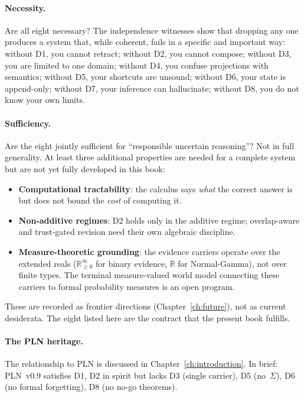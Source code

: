\documentclass[11pt,openany]{report}
\begin{document}
\paragraph{Necessity.}
Are all eight necessary?  The independence witnesses show that dropping
any one produces a system that, while coherent, fails in a specific and
important way: without D1, you cannot retract; without D2, you cannot
compose; without D3, you are limited to one domain; without D4, you
confuse projections with semantics; without D5, your shortcuts are
unsound; without D6, your state is append-only; without D7, your
inference can hallucinate; without D8, you do not know your own limits.

\paragraph{Sufficiency.}
Are the eight jointly sufficient for ``responsible uncertain
reasoning''?  Not in full generality.  At least three additional
properties are needed for a complete system but are not yet fully
developed in this book:
\begin{itemize}
\item \textbf{Computational tractability}: the calculus says
  \emph{what} the correct answer is but does not bound the
  \emph{cost} of computing it.
\item \textbf{Non-additive regimes}: D2 holds only in the additive
  regime; overlap-aware and trust-gated revision need their own
  algebraic discipline.
\item \textbf{Measure-theoretic grounding}: the evidence carriers
  operate over the extended reals ($\mathbb{R}_{\ge 0}^\infty$
  for binary evidence, $\mathbb{R}$ for Normal-Gamma), not
  over finite types.  The terminal measure-valued world model
  connecting these carriers to formal probability measures is an
  open program.
\end{itemize}
These are recorded as frontier directions (Chapter~\ref{ch:future}),
not as current desiderata.  The eight listed here are the contract
that the present book fulfills.

\paragraph{The PLN heritage.}
The relationship to PLN is discussed in
Chapter~\ref{ch:introduction}.  In brief: PLN~v0.9 satisfies D1,
D2 in spirit but lacks D3 (single carrier), D5 (no~$\Sigma$),
D6 (no formal forgetting), D8 (no no-go theorems).
\end{document}
